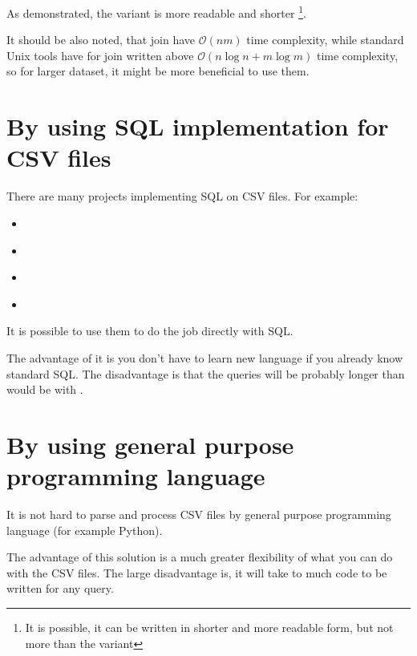 As demonstrated, the  variant is more readable and shorter 
\footnote{It is possible, it can be written in shorter and more readable form, but not more than the  variant}.

It should be also noted, that  join have $\mathcal{O}(nm)$ time complexity, while standard Unix tools have for join written above
$\mathcal{O}(n\log n + m\log m)$ time complexity, so for larger dataset, it might be more beneficial to use them.

\section{By using SQL implementation for CSV files}
There are many projects implementing SQL on CSV files. For example:
\begin{itemize}
    \item {} \cite{q}
    \item {} \cite{csv-sql} 
    \item {} \cite{trdsql}
    \item {} \cite{csvq}
\end{itemize}

It is possible to use them to do the job directly with SQL. 

The advantage of it is you don't have to learn new language if you already know standard SQL. 
The disadvantage is that the queries will be probably longer than would be with .

\section{By using general purpose programming language}
It is not hard to parse and process CSV files by general purpose programming language (for example Python).

The advantage of this solution is a much greater flexibility of what you can do with the CSV files.
The large disadvantage is, it will take to much code to be written for any query.

